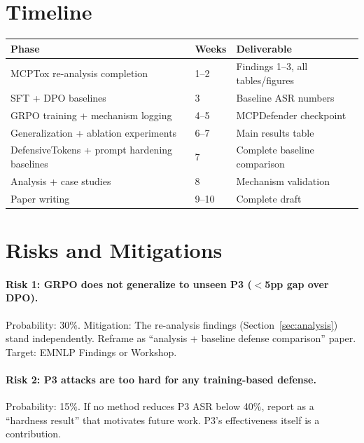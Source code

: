\documentclass[11pt,a4paper]{article}
\begin{document}
\section{Timeline}
\label{sec:timeline}

\begin{table}[h]
\centering
\small
\begin{tabular}{lll}
\toprule
\textbf{Phase} & \textbf{Weeks} & \textbf{Deliverable} \\
\midrule
MCPTox re-analysis completion & 1--2 & Findings 1--3, all tables/figures \\
SFT + DPO baselines & 3 & Baseline ASR numbers \\
GRPO training + mechanism logging & 4--5 & MCPDefender checkpoint \\
Generalization + ablation experiments & 6--7 & Main results table \\
DefensiveTokens + prompt hardening baselines & 7 & Complete baseline comparison \\
Analysis + case studies & 8 & Mechanism validation \\
Paper writing & 9--10 & Complete draft \\
\bottomrule
\end{tabular}
\end{table}


\section{Risks and Mitigations}

\paragraph{Risk 1: GRPO does not generalize to unseen P3 ($<$5pp gap over DPO).}
Probability: 30\%. Mitigation: The re-analysis findings (Section~\ref{sec:analysis}) stand independently. Reframe as ``analysis + baseline defense comparison'' paper. Target: EMNLP Findings or Workshop.

\paragraph{Risk 2: P3 attacks are too hard for any training-based defense.}
Probability: 15\%. If no method reduces P3 ASR below 40\%, report as a ``hardness result'' that motivates future work. P3's effectiveness itself is a contribution.
\end{document}
